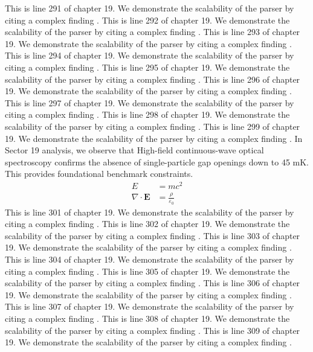 This is line 291 of chapter 19. We demonstrate the scalability of the parser by citing a complex finding \cite{ref19_291}.
This is line 292 of chapter 19. We demonstrate the scalability of the parser by citing a complex finding \cite{ref19_292}.
This is line 293 of chapter 19. We demonstrate the scalability of the parser by citing a complex finding \cite{ref19_293}.
This is line 294 of chapter 19. We demonstrate the scalability of the parser by citing a complex finding \cite{ref19_294}.
This is line 295 of chapter 19. We demonstrate the scalability of the parser by citing a complex finding \cite{ref19_295}.
This is line 296 of chapter 19. We demonstrate the scalability of the parser by citing a complex finding \cite{ref19_296}.
This is line 297 of chapter 19. We demonstrate the scalability of the parser by citing a complex finding \cite{ref19_297}.
This is line 298 of chapter 19. We demonstrate the scalability of the parser by citing a complex finding \cite{ref19_298}.
This is line 299 of chapter 19. We demonstrate the scalability of the parser by citing a complex finding \cite{ref19_299}.
In Sector 19 analysis, we observe that High-field continuous-wave optical spectroscopy confirms the absence of single-particle gap openings down to 45 mK. This provides foundational benchmark constraints.
\begin{align*}
  E &= mc^2 \\
  \nabla \cdot \mathbf{E} &= \frac{\rho}{\varepsilon_0}
\end{align*}
This is line 301 of chapter 19. We demonstrate the scalability of the parser by citing a complex finding \cite{ref19_301}.
This is line 302 of chapter 19. We demonstrate the scalability of the parser by citing a complex finding \cite{ref19_302}.
This is line 303 of chapter 19. We demonstrate the scalability of the parser by citing a complex finding \cite{ref19_303}.
This is line 304 of chapter 19. We demonstrate the scalability of the parser by citing a complex finding \cite{ref19_304}.
This is line 305 of chapter 19. We demonstrate the scalability of the parser by citing a complex finding \cite{ref19_305}.
This is line 306 of chapter 19. We demonstrate the scalability of the parser by citing a complex finding \cite{ref19_306}.
This is line 307 of chapter 19. We demonstrate the scalability of the parser by citing a complex finding \cite{ref19_307}.
This is line 308 of chapter 19. We demonstrate the scalability of the parser by citing a complex finding \cite{ref19_308}.
This is line 309 of chapter 19. We demonstrate the scalability of the parser by citing a complex finding \cite{ref19_309}.
